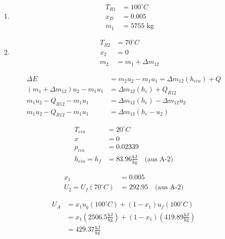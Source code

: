 \begin{enumerate}
    \item 
    \begin{align*}
        T_{R1} &= 100^\circ C \\
        x_D &= 0.005 \\
        m_1 &= 5755 \text{ kg}
    \end{align*}
    
    \item 
    \begin{align*}
        T_{R2} &= 70^\circ C \\
        x_2 &= 0 \\
        m_2 &= m_1 + \Delta m_{12}
    \end{align*}
\end{enumerate}

\noindent
{}

\begin{align*}
    \Delta E &= m_2 u_2 - m_1 u_1 = \Delta m_{12} (h_{ein}) + Q \\
    (m_1 + \Delta m_{12}) u_2 - m_1 u_1 &= \Delta m_{12} (h_e) + Q_{R12} \\
    m_1 u_2 - Q_{R12} - m_1 u_1 &= \Delta m_{12} (h_e) - \Delta m_{12} u_2 \\
    m_1 u_2 - Q_{R12} - m_1 u_1 &= \Delta m_{12} (h_e - u_2)
\end{align*}

\noindent
{}
\begin{align*}
    T_{ein} &= 20^\circ C \\
    x &= 0 \\
    p_{ein} &= 0.02339 \\
    h_{ein} = h_f &= 83.96 \frac{\text{kJ}}{\text{kg}} \quad \text{(aus A-2)}
\end{align*}

\noindent
{}
\begin{align*}
    x_1 &= 0.005 \\
    U_2 = U_f (70^\circ C) &= 292.95 \quad \text{(aus A-2)}
\end{align*}

\noindent
{}
\begin{align*}
    U_A &= x_1 u_g (100^\circ C) + (1 - x_1) u_f (100^\circ C) \\
    &= x_1 \left( 2506.5 \frac{\text{kJ}}{\text{kg}} \right) + (1 - x_1) \left( 419.89 \frac{\text{kJ}}{\text{kg}} \right) \\
    &= 429.37 \frac{\text{kJ}}{\text{kg}}
\end{align*}

